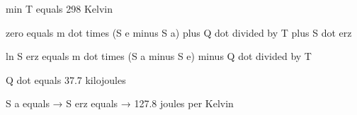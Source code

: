 min T equals 298 Kelvin  

zero equals m dot times (S e minus S a) plus Q dot divided by T plus S dot erz  

ln S erz equals m dot times (S a minus S e) minus Q dot divided by T  

Q dot equals 37.7 kilojoules  

S a equals → S erz equals → 127.8 joules per Kelvin